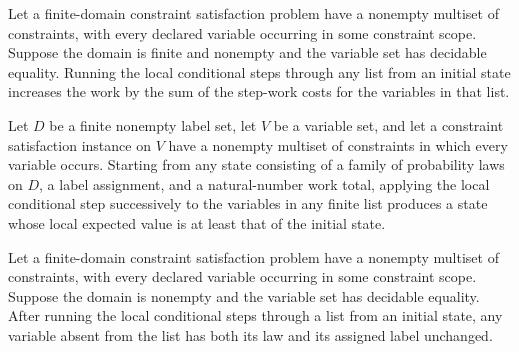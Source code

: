 \begin{theorem}
\label{FABL.CSPInstance.runLocalConditionalSteps_work}
\leanok
{}
Let a finite-domain constraint satisfaction problem have a nonempty multiset of
constraints, with every declared variable occurring in some constraint scope. Suppose
the domain is finite and nonempty and the variable set has decidable equality. Running
the local conditional steps through any list from an initial state increases the work by
the sum of the step-work costs for the variables in that list.
\end{theorem}

\begin{theorem}
\label{FABL.CSPInstance.localExpectedValue_le_runLocalConditionalSteps}
\leanok
{}
Let $D$ be a finite nonempty label set, let $V$ be a variable set, and let a constraint
satisfaction instance on $V$ have a nonempty multiset of constraints in which every
variable occurs. Starting from any state consisting of a family of probability laws on
$D$, a label assignment, and a natural-number work total, applying the local conditional
step successively to the variables in any finite list produces a state whose local
expected value is at least that of the initial state.
\end{theorem}

\begin{theorem}
\label{FABL.CSPInstance.runLocalConditionalSteps_preserves_of_not_mem}
\leanok
{}
Let a finite-domain constraint satisfaction problem have a nonempty multiset of
constraints, with every declared variable occurring in some constraint scope. Suppose
the domain is nonempty and the variable set has decidable equality. After running the
local conditional steps through a list from an initial state, any variable absent from
the list has both its law and its assigned label unchanged.
\end{theorem}

